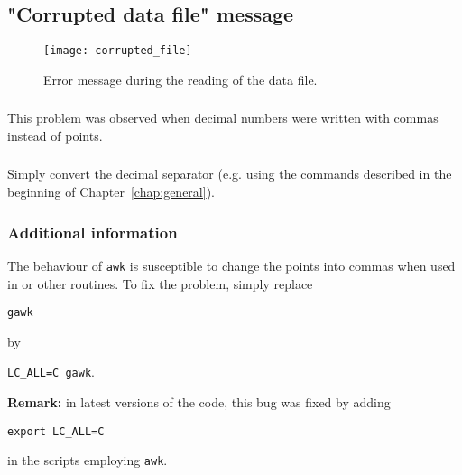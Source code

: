 \subsection{"Corrupted data file" message}


\begin{figure}[htpb]
\centering
\texttt{[image: corrupted\_file]}
\caption{Error message during the reading of the data file.}
\end{figure}

\subsubsection{\question}


This problem was observed when decimal numbers were written with commas instead of points.


\subsubsection{\answer}

Simply convert the decimal separator (e.g. using the commands described in the beginning of Chapter~\ref{chap:general}).


\subsubsection{Additional information}

The behaviour of \texttt{awk} is susceptible to change the points into commas when used in  or other routines. To fix the problem, simply replace

\texttt{gawk}

by

\texttt{LC\_ALL=C gawk}.

\textbf{Remark:} in latest versions of the code, this bug was fixed by adding 

\texttt{export LC\_ALL=C}

in the scripts employing \texttt{awk}.